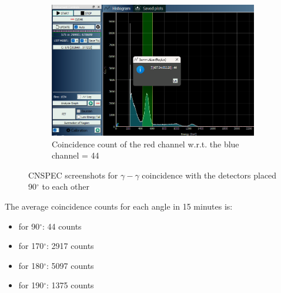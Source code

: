\begin{figure}[H]
    \ContinuedFloat
    

    \begin{subfigure}{\linewidth}
        \includegraphics[width=1\textwidth]{images/90/ccblue.png}
        \caption{Coincidence count of the red channel w.r.t. the blue channel = 44}
    \end{subfigure}
    

    \caption{CNSPEC screenshots for $\gamma-\gamma$ coincidence with the detectors placed 90$^\circ$ to each other}
    \label{90}
\end{figure}

The average coincidence counts for each angle in 15 minutes is:

\begin{itemize}
    \item for 90$^\circ$: 44 counts
    \item for 170$^\circ$: 2917 counts
    \item for 180$^\circ$: 5097 counts
    \item for 190$^\circ$: 1375 counts\\
\end{itemize}

